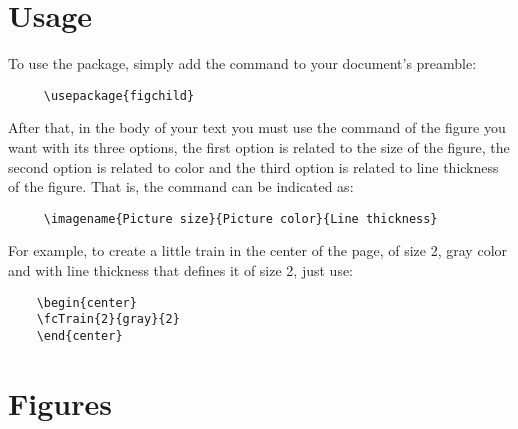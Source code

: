 \documentclass[x11names]{article}
\begin{document}

\section{Usage}

\hspace{\parindent}To use the package, simply add the command to your document's preamble:

\begin{verbatim}
     \usepackage{figchild}
\end{verbatim}

After that, in the body of your text you must use the command of the figure you want with its three options, the first option is related to the size of the figure, the second option is related to color and the third option is related to line thickness of the figure. That is, the command can be indicated as:

\begin{verbatim}
     \imagename{Picture size}{Picture color}{Line thickness}
\end{verbatim}

For example, to create a little train in the center of the page, of size 2, gray color and with line thickness that defines it of size 2, just use:

\begin{verbatim}
    \begin{center}
    \fcTrain{2}{gray}{2}
    \end{center}
\end{verbatim}

\begin{center}
\end{center}

\newpage

\section{Figures}

\newpage
\end{document}
